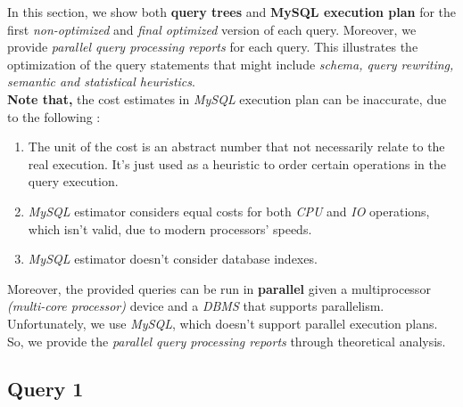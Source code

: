 In this section, we show both \textbf{query trees} and \textbf{MySQL execution plan} for the first \emph{non-optimized} and \emph{final optimized} version of each query. Moreover, we provide \emph{parallel query processing reports} for each query. This illustrates the optimization of the query statements that might include \emph{schema, query rewriting, semantic and statistical heuristics}. \\

\textbf{Note that,} the cost estimates in \emph{MySQL} execution plan can be inaccurate, due to the following :
\begin{enumerate}
    \item The unit of the cost is an abstract number that not necessarily relate to the real execution. It's just used as a heuristic to order certain operations in the query execution.
    \item \emph{MySQL} estimator considers equal costs for both \emph{CPU} and \emph{IO} operations, which isn't valid, due to modern processors' speeds.
    \item \emph{MySQL} estimator doesn't consider database indexes.
\end{enumerate}

Moreover, the provided queries can be run in \textbf{parallel} given a multiprocessor \emph{(multi-core processor)} device and a \emph{DBMS} that supports parallelism. Unfortunately, we use \emph{MySQL}, which doesn't support parallel execution plans. So, we provide the \emph{parallel query processing reports} through theoretical analysis.

\subsection{Query 1}

